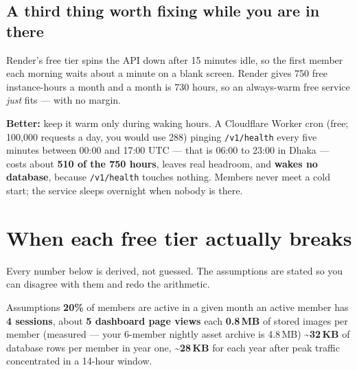 \documentclass[11pt,a4paper]{article}
\begin{document}
\subsection{A third thing worth fixing while you are in there}

Render's free tier spins the API down after 15 minutes idle, so the first member each morning waits about a minute on a blank screen. Render gives 750 free instance-hours a month and a month is 730 hours, so an always-warm free service \emph{just} fits --- with no margin.

\textbf{Better:} keep it warm only during waking hours. A Cloudflare Worker cron (free; 100{,}000 requests a day, you would use 288) pinging \texttt{/v1/health} every five minutes between 00:00 and 17:00 UTC --- that is 06:00 to 23:00 in Dhaka --- costs about \textbf{510 of the 750 hours}, leaves real headroom, and \textbf{wakes no database}, because \texttt{/v1/health} touches nothing. Members never meet a cold start; the service sleeps overnight when nobody is there.

\clearpage
\section{When each free tier actually breaks}

Every number below is derived, not guessed. The assumptions are stated so you can disagree with them and redo the arithmetic.

\begin{notebox}{Assumptions}
\textbf{20\%} of members are active in a given month \textperiodcentered{} an active member has \textbf{4 sessions}, about \textbf{5 dashboard page views} each \textperiodcentered{} \textbf{0.8\,MB} of stored images per member (measured --- your 6-member nightly asset archive is 4.8\,MB) \textperiodcentered{} \textbf{\textasciitilde32\,KB} of database rows per member in year one, \textbf{\textasciitilde28\,KB} for each year after \textperiodcentered{} peak traffic concentrated in a 14-hour window.
\end{notebox}
\end{document}
